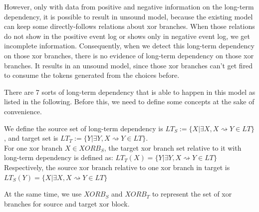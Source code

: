 However, only with data from positive and negative information on the long-term dependency, it is possible to result in unsound model, because the existing model can keep some directly-follows relations about xor branches. When those relations do not show in the positive event log or shows only in negative event log, we get incomplete information. Consequently, when we detect this long-term dependency on those xor branches, there is no evidence of long-term dependency on those xor branches. It results in an unsound model, since those xor branches can't get fired to consume the tokens generated from the choices before.


There are 7 sorts of long-term dependency that is able to happen in this model as listed in the following. Before this, we need to define some concepts at the sake of convenience.
\begin{definition}
	We define the source set of long-term dependency is  $LT_S:= \{X \vert \exists X, X\rightsquigarrow Y  \in LT \} $, and target set is $LT_T:= \{Y \vert \exists Y, X\rightsquigarrow Y \in LT \} $. \\
	For one xor branch $X \in XORB_S$, the target xor branch set relative to it with long-term dependency is defined as:
	$ LT_T(X)= \{Y \vert \exists Y, X\rightsquigarrow Y \in LT \}$
	Respectively, the source xor branch relative to one xor branch in target is
	$ LT_S(Y)= \{X \vert \exists X, X\rightsquigarrow Y \in LT \}$
\end{definition}
At the same time, we use $XORB_S $ and $XORB_T$ to represent the set of xor branches for source and target xor block. 
